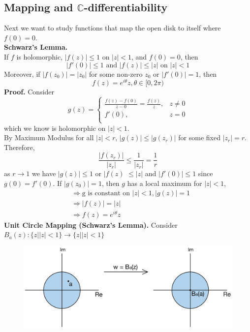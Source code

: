 \documentclass[11pt]{article}
\begin{document}
\subsection{Mapping and $\mathbb{C}$-differentiability}
Next we want to study functions that map the open disk to itself where $f(0) = 0$. \\
\newline
\textbf{Schwarz's Lemma.}\\
If $f$ is holomorphic, $|f(z)| \leqslant 1$ on $|z| < 1$, and $f(0) = 0$, then 
\begin{equation*}
|f'(0)| \leqslant 1 \mbox{ and } |f(z)| \leqslant |z| \mbox{ on } |z| < 1
\end{equation*}
Moreover, if $|f(z_0)| = |z_0|$ for some non-zero $z_0$ or $|f'(0)| = 1$, then 
$$f(z) = e^{i\theta}z, \theta \in [0, 2\pi)$$
\textbf{Proof.} Consider
$$
g(z) = 
\begin{cases} 
	\frac{f(z) - f(0)}{z - 0} = \frac{f(z)}{z}, &z \neq 0 \\
	f'(0), &z = 0\\
\end{cases}
$$
which we know is holomorphic on $|z| < 1$. \\
By Maximum Modulus for all $|z| < r$, $|g(z)| \leqslant |g(z_r)|$ for some fixed $|z_r| = r$. Therefore, 
$$\frac{|f(z_r)|}{|z_r|} \leqslant \frac{1}{|z_r|} = \frac{1}{r}$$
as $r \to 1$ we have $|g(z)| \leqslant 1$ or $|f(z)$ $\leqslant |z|$ and $|f'(0)| \leqslant 1$ since $g(0) = f'(0)$. 
If $|g(z_0)| = 1$, then $g$ has a local maximum for $|z| < 1$, 
\begin{align*}
&\Rightarrow \mbox{g is constant on } |z| < 1, |g(z)| = 1\\
&\Rightarrow |f(z)| = |z| \\
&\Rightarrow f(z) = e^{i\theta}z
\end{align*} 
\textbf{Unit Circle Mapping (Schwarz's Lemma).} Consider $B_a(z): \{z| |z| < 1\} \to \{z| |z| < 1\}$ 
\begin{figure}[H]
\includegraphics[scale = 0.2]{14_3}
\centering
\end{figure} 
\end{document}
